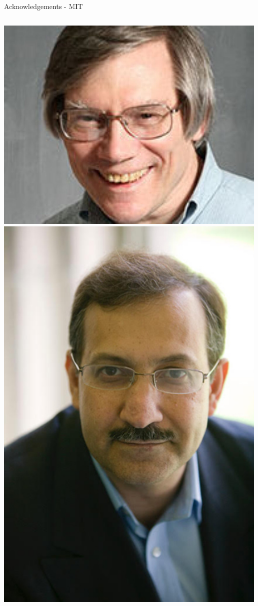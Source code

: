 \documentclass[aspectratio=169]{beamer}
\begin{document}
\begin{frame}{Acknowledgements - MIT}
    \begin{columns}

            \centering
            \includegraphics[width=0.99\textwidth]{people/milnergroup/alanguth.png}
            \includegraphics[width=0.99\textwidth]{people/milnergroup/kardar.png}

\end{columns}
\end{frame}
\end{document}
